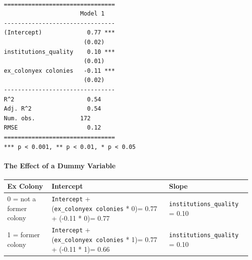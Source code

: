 \documentclass[]{article}
\let\oldparagraph\paragraph
\renewcommand{\paragraph}[1]{\oldparagraph{#1}\mbox{}}
\theoremstyle{definition}
\theoremstyle{definition}
\theoremstyle{definition}
\theoremstyle{remark}
\begin{document}
\begin{verbatim}

================================
                      Model 1   
--------------------------------
(Intercept)             0.77 ***
                       (0.02)   
institutions_quality    0.10 ***
                       (0.01)   
ex_colonyex colonies   -0.11 ***
                       (0.02)   
--------------------------------
R^2                     0.54    
Adj. R^2                0.54    
Num. obs.             172       
RMSE                    0.12    
================================
*** p < 0.001, ** p < 0.01, * p < 0.05
\end{verbatim}

\paragraph{The Effect of a Dummy
Variable}\label{the-effect-of-a-dummy-variable}

\begin{longtable}[]{@{}lll@{}}
\toprule
\begin{minipage}[b]{0.26\columnwidth}\raggedright\strut
Ex Colony\strut
\end{minipage} & \begin{minipage}[b]{0.35\columnwidth}\raggedright\strut
Intercept\strut
\end{minipage} & \begin{minipage}[b]{0.30\columnwidth}\raggedright\strut
Slope\strut
\end{minipage}\tabularnewline
\midrule
\endhead
\begin{minipage}[t]{0.26\columnwidth}\raggedright\strut
0 = not a former colony\strut
\end{minipage} & \begin{minipage}[t]{0.35\columnwidth}\raggedright\strut
\texttt{Intercept} + (\texttt{ex\_colonyex\ colonies} * 0)= 0.77 +
(-0.11 * 0)= 0.77\strut
\end{minipage} & \begin{minipage}[t]{0.30\columnwidth}\raggedright\strut
\texttt{institutions\_quality} = 0.10\strut
\end{minipage}\tabularnewline
\begin{minipage}[t]{0.26\columnwidth}\raggedright\strut
1 = former colony\strut
\end{minipage} & \begin{minipage}[t]{0.35\columnwidth}\raggedright\strut
\texttt{Intercept} + (\texttt{ex\_colonyex\ colonies} * 1)= 0.77 +
(-0.11 * 1)= 0.66\strut
\end{minipage} & \begin{minipage}[t]{0.30\columnwidth}\raggedright\strut
\texttt{institutions\_quality} = 0.10\strut
\end{minipage}\tabularnewline
\bottomrule
\end{longtable}
\end{document}

